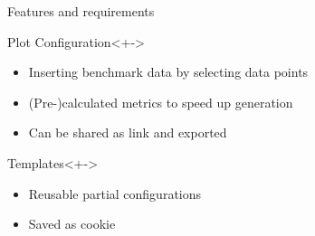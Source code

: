 
\begin{frame}{Features and requirements}
  \begin{block}{Plot Configuration}<+->
  	\begin{itemize}[<+->]
  	  \item Inserting benchmark data by selecting data points
      \item (Pre-)calculated metrics to speed up generation
      \item Can be shared as link and exported
  	\end{itemize}
  \end{block}
  \begin{block}{Templates}<+->
  	\begin{itemize}[<+->]
      \item Reusable partial configurations
      \item Saved as cookie
    \end{itemize}
  \end{block}
  \onslide<+->
\end{frame}